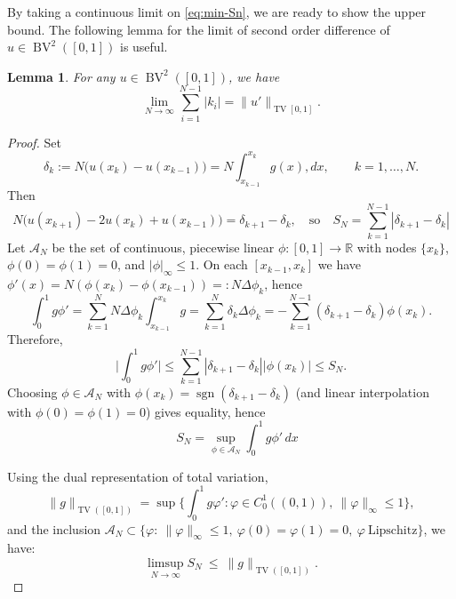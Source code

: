\documentclass[12pt]{amsart}
\numberwithin{equation}{section}
\newtheorem{lemma}{Lemma}[section]
\theoremstyle{remark}
\newcommand{\ql}[1]{\texttt{\color{cyan} QL: \footnotesize #1}}
\begin{document}
By taking a continuous limit on \eqref{eq:min-Sn}, we are ready to show the upper bound.
The following lemma for the limit of second order difference of $u\in \operatorname{BV}^2([0,1])$ is useful.
\begin{lemma}
    \label{lem:limit-second-difference}
    For any $u\in \operatorname{BV}^2([0,1])$, we have
    \begin{equation}
        \lim_{N\to\infty} \sum_{i=1}^{N-1} |k_i| = \|u'\|_{\operatorname{TV}[0,1]}.
    \end{equation}
\end{lemma}
\begin{proof}
Set
\begin{equation}
    \delta_k := N\big(u(x_k)-u(x_{k-1})\big) = N\int_{x_{k-1}}^{x_k} g(x),dx,\qquad k=1,\dots,N.
\end{equation}
Then
\begin{equation}
    N\big(u(x_{k+1})-2u(x_k)+u(x_{k-1})\big)=\delta_{k+1}-\delta_k,
\quad\text{so}\quad
S_N=\sum_{k=1}^{N-1}|\delta_{k+1}-\delta_k|
\end{equation}
Let $\mathcal A_N$ be the set of continuous, piecewise linear $\phi:[0,1]\to\mathbb R$ with nodes $\{x_k\}$, $\phi(0)=\phi(1)=0$, and $|\phi|_\infty\le 1$. On each $[x_{k-1},x_k]$ we have $\phi'(x)=N(\phi(x_k)-\phi(x_{k-1}))=:N\Delta\phi_k$, hence
\begin{equation}
\int_0^1 g\phi'
=\sum_{k=1}^{N} N\Delta\phi_k\int_{x_{k-1}}^{x_k} g
=\sum_{k=1}^{N}\delta_k\Delta\phi_k
= -\sum_{k=1}^{N-1}(\delta_{k+1}-\delta_k)\phi(x_k).
\end{equation}
Therefore,
\begin{equation}
\bigg|\int_0^1 g\phi'\bigg|
\le \sum_{k=1}^{N-1}|\delta_{k+1}-\delta_k||\phi(x_k)|
\le S_N.
\end{equation}
Choosing $\phi\in\mathcal A_N$ with $\phi(x_k)=\operatorname{sgn}(\delta_{k+1}-\delta_k)$ (and linear interpolation with $\phi(0)=\phi(1)=0$) gives equality, hence
\begin{equation}
\quad S_N=\sup_{\phi\in\mathcal A_N}\int_0^1 g\phi'\,dx
\end{equation}

Using the dual representation of total variation,
\begin{equation}
\|g\|_{\operatorname{TV}([0,1])}
=\sup\Big\{\int_0^1 g\varphi' : \varphi\in C_0^1((0,1)),\ \|\varphi\|_\infty\le 1\Big\},
\end{equation}
and the inclusion $\mathcal A_N\subset\{\varphi:\ \|\varphi\|_\infty\le1,\ \varphi(0)=\varphi(1)=0,\ \varphi\ \text{Lipschitz}\}$, we have:
\begin{equation}
\limsup_{N\to\infty} S_N \ \le\ \|g\|_{\operatorname{TV}([0,1])}.
\end{equation}


\end{proof}
\end{document}
